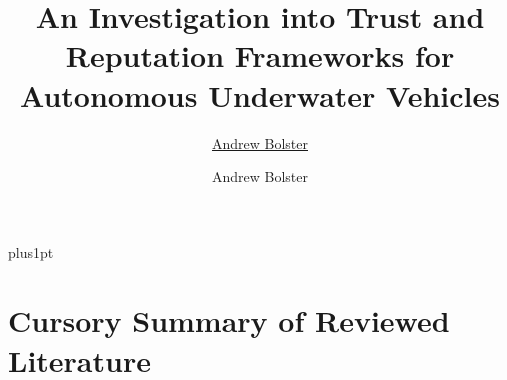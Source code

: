 \documentclass[twoside,9pt,a4paper]{Latex/Classes/PhDthesisPSnPDF}
\title{An Investigation into Trust and Reputation Frameworks for Autonomous Underwater Vehicles}
\author{\href{mailto:me@andrewbolster.info}{Andrew Bolster}}
\author{Andrew Bolster}
\begin{document}

\renewcommand\baselinestretch{1.2}
\baselineskip=18pt plus1pt



\maketitle  %





%   


\setcounter{secnumdepth}{3} %
\setcounter{tocdepth}{3}    %
\tableofcontents            %


\mainmatter

\renewcommand{\chaptername}{} %


\chapter{Cursory Summary of Reviewed Literature}
\end{document}
